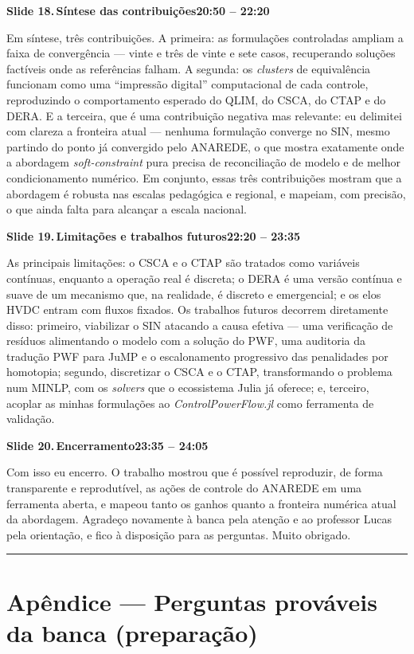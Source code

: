 \documentclass[11pt,a4paper]{article}
\newcommand{\slide}[3]{%
  \bigskip
  \noindent\colorbox{chipbg}{\parbox{\dimexpr\linewidth-2\fboxsep\relax}{%
    \textbf{\textcolor{ufcblue}{#1}}\,\textbf{#2}\hfill\textbf{\textcolor{ufcblue}{#3}}}}\par
  \nopagebreak\medskip
}
\begin{document}
\slide{Slide 18.}{Síntese das contribuições}{20:50 -- 22:20}
Em síntese, três contribuições. A primeira: as formulações controladas ampliam a faixa de convergência --- vinte e três de vinte e sete casos, recuperando soluções factíveis onde as referências falham. A segunda: os \textit{clusters} de equivalência funcionam como uma ``impressão digital'' computacional de cada controle, reproduzindo o comportamento esperado do QLIM, do CSCA, do CTAP e do DERA. E a terceira, que é uma contribuição negativa mas relevante: eu delimitei com clareza a fronteira atual --- nenhuma formulação converge no SIN, mesmo partindo do ponto já convergido pelo ANAREDE, o que mostra exatamente onde a abordagem \textit{soft-constraint} pura precisa de reconciliação de modelo e de melhor condicionamento numérico. Em conjunto, essas três contribuições mostram que a abordagem é robusta nas escalas pedagógica e regional, e mapeiam, com precisão, o que ainda falta para alcançar a escala nacional.

\slide{Slide 19.}{Limitações e trabalhos futuros}{22:20 -- 23:35}
As principais limitações: o CSCA e o CTAP são tratados como variáveis contínuas, enquanto a operação real é discreta; o DERA é uma versão contínua e suave de um mecanismo que, na realidade, é discreto e emergencial; e os elos HVDC entram com fluxos fixados. Os trabalhos futuros decorrem diretamente disso: primeiro, viabilizar o SIN atacando a causa efetiva --- uma verificação de resíduos alimentando o modelo com a solução do PWF, uma auditoria da tradução PWF para JuMP e o escalonamento progressivo das penalidades por homotopia; segundo, discretizar o CSCA e o CTAP, transformando o problema num MINLP, com os \textit{solvers} que o ecossistema Julia já oferece; e, terceiro, acoplar as minhas formulações ao \textit{ControlPowerFlow.jl} como ferramenta de validação.

\slide{Slide 20.}{Encerramento}{23:35 -- 24:05}
Com isso eu encerro. O trabalho mostrou que é possível reproduzir, de forma transparente e reprodutível, as ações de controle do ANAREDE em uma ferramenta aberta, e mapeou tanto os ganhos quanto a fronteira numérica atual da abordagem. Agradeço novamente à banca pela atenção e ao professor Lucas pela orientação, e fico à disposição para as perguntas. Muito obrigado.

\bigskip
\rule{\linewidth}{0.6pt}
\section*{\textcolor{ufcblue}{Apêndice --- Perguntas prováveis da banca (preparação)}}
\end{document}
